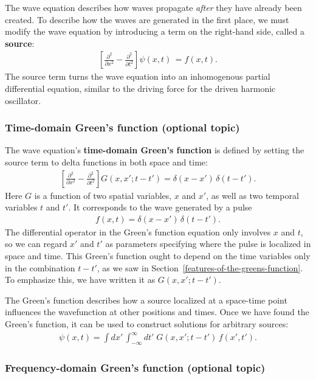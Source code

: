 \documentclass[10pt,a4paper]{article}
\begin{document}
The wave equation describes how waves propagate \textit{after} they
have already been created. To describe how the waves are generated in
the first place, we must modify the wave equation by introducing a
term on the right-hand side, called a \textbf{source}:
\begin{align}
  \left[\frac{\partial^2}{\partial x^2} - \frac{\partial^2}{\partial t^2} \right] \psi(x,t)\, = f(x,t).
\end{align}
The source term turns the wave equation into an inhomogenous partial
differential equation, similar to the driving force for the driven
harmonic oscillator.

\subsubsection{Time-domain Green's function (optional topic)}
\label{time-domain-greens-function}

The wave equation's \textbf{time-domain Green's function} is defined
by setting the source term to delta functions in both space and time:
\begin{align}
  \left[\frac{\partial^2}{\partial x^2} - \frac{\partial^2}{\partial t^2} \right] G(x,x';t-t') = \delta(x-x')\, \delta(t-t').
\end{align}
Here $G$ is a function of two spatial variables, $x$ and $x'$, as well
as two temporal variables $t$ and $t'$.  It corresponds to the wave
generated by a pulse
\begin{align}
  f(x,t) = \delta(x-x')\,\delta(t-t').
\end{align}
The differential operator in the Green's function equation only
involves $x$ and $t$, so we can regard $x'$ and $t'$ as parameters
specifying where the pulse is localized in space and time.  This
Green's function ought to depend on the time variables only in the
combination $t-t'$, as we saw in
Section~\ref{features-of-the-greens-function}. To emphasize this, we
have written it as $G(x,x';t-t')$.

The Green's function describes how a source localized at a space-time
point influences the wavefunction at other positions and times. Once
we have found the Green's function, it can be used to construct
solutions for arbitrary sources:
\begin{align}
  \psi(x,t) = \int dx' \,\int_{-\infty}^\infty dt'\; G(x,x';t-t') \, f(x', t').
\end{align}

\subsubsection{Frequency-domain Green's function (optional topic)}
\label{frequency-domain-greens-function}
\end{document}
